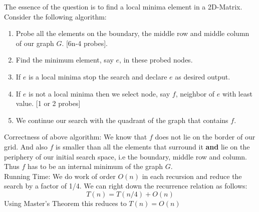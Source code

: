 \documentclass[11pt]{article}
\begin{document}
The essence of the question is to find a local minima element in a 2D-Matrix. \\

Consider the following algorithm:
\begin{enumerate}
\item  Probe all the elements on the boundary, the middle row and middle column of our graph $ G $. [6n-4 probes].
\item  Find the minimum element, say $ e $, in these probed nodes.
\item  If $ e $ is a local minima stop the search and declare $ e $ as desired output.
\item  If $ e $ is not a local minima then we select node, say $ f $, neighbor of $ e $ with least value. [1 or 2 probes]
\item  We continue our search with the quadrant of the graph that contains $ f $.
\end{enumerate}

Correctness of above algorithm:
We know that $ f $ does not lie on the border of our grid. And also $ f $ is smaller than all the elements that surround it \textbf{and} lie on the periphery of our initial search space, i.e the boundary, middle row and column. Thus $ f $ has to be an internal minimum of the graph $ G $. \\

Running Time:
We do work of order $ O(n) $ in each recursion and reduce the search by a factor of 1/4. We can right down the recurrence relation as follows:
\begin{equation*}
T(n) = T(n/4) + O(n)
\end{equation*}
Using Master's Theorem this reduces to $ T(n) = O(n) $
\end{document}
